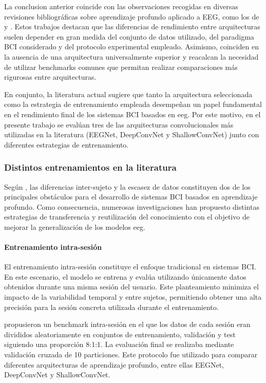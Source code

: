 La conclusion anterior coincide con las observaciones recogidas en diversas revisiones bibliográficas sobre aprendizaje profundo aplicado a EEG, como los de \textcite{craik_DeepLearning2019} y \textcite{roy_DeepLearningbased2019}. Estos trabajos destacan que las diferencias de rendimiento entre arquitecturas suelen depender en gran medida del conjunto de datos utilizado, del paradigma BCI considerado y del protocolo experimental empleado. Asimismo, coinciden en la ausencia de una arquitectura universalmente superior y reacalcan la necesidad de utilizar benchmarks comunes que permitan realizar comparaciones más rigurosas entre arquitecturas.

En conjunto, la literatura actual sugiere que tanto la arquitectura seleccionada como la estrategia de entrenamiento empleada desempeñan un papel fundamental en el rendimiento final de los sistemas BCI basados en \acrshort{eeg}. Por este motivo, en el presente trabajo se evalúan tres de las arquitecturas convolucionales más utilizadas en la literatura (EEGNet, DeepConvNet y ShallowConvNet) junto con diferentes estrategias de entrenamiento.

\subsubsection{Distintos entrenamientos en la literatura}\label{sec:metodos_entrenamiento}

Según \textcite{wan_ReviewTransfer2021}, las diferencias inter-sujeto y la escasez de datos constituyen dos de los principales obstáculos para el desarrollo de sistemas BCI basados en aprendizaje profundo. Como consecuencia, numerosas investigaciones han propuesto distintas estrategias de transferencia y reutilización del conocimiento con el objetivo de mejorar la generalización de los modelos \acrshort{eeg}.

\paragraph*{Entrenamiento intra-sesión}

El entrenamiento intra-sesión constituye el enfoque tradicional en sistemas BCI. En este escenario, el modelo se entrena y evalúa utilizando únicamente datos obtenidos durante una misma sesión del usuario. Este planteamiento minimiza el impacto de la variabilidad temporal y entre sujetos, permitiendo obtener una alta precisión para la sesión concreta utilizada durante el entrenamiento.

\textcite{ma_LargeEEG2022} propusieron un benchmark intra-sesión en el que los datos de cada sesión eran divididos aleatoriamente en conjuntos de entrenamiento, validación y test siguiendo una proporción 8:1:1. La evaluación final se realizaba mediante validación cruzada de 10 particiones. Este protocolo fue utilizado para comparar diferentes arquitecturas de aprendizaje profundo, entre ellas EEGNet, DeepConvNet y ShallowConvNet.

